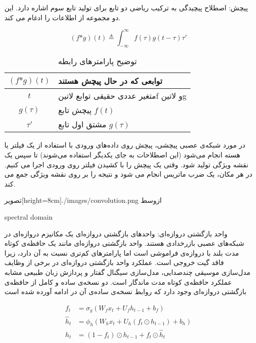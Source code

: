 
پیچش: اصطلاح پیچیدگی به ترکیب ریاضی دو تابع برای تولید تابع سوم اشاره دارد. این دو مجموعه از اطلاعات را ادغام می کند.


\begin{equation}
  \label{eq:base}
(f \text{*} g)(t) \triangleq \int_{-\infty}^\infty f(\tau)g(t - \tau)\tau'
\end{equation}


\begin{table}[h]
  \centering
  \caption{توضیح پارامترهای رابطه }
  \begin{tabular}{|c|p{}|}
    \hline
    $(f \text{*} g)(t)$ & توابعی که در حال پیچش هستند \\
    \hline
    $t$ & متغیر عددی حقیقی توابع  لاتین{f}  و  لاتین{g} \\
    \hline
    $g(\tau)$ & پیچش تابع $f(t)$ \\
    \hline
    $\tau'$ & مشتق اول تابع $g(\tau)$ \\
    \hline
  \end{tabular}
  \label{tbl:distance}
\end{table}


در مورد شبکه‌ی عصبی پیچشی، پیچش روی داده‌های ورودی با استفاده از یک فیلتر یا هسته انجام می‌شود (این اصطلاحات به جای یکدیگر استفاده می‌شوند) تا سپس یک نقشه ویژگی تولید شود. وقتی یک پیچش را با کشیدن فیلتر روی ورودی اجرا می کنیم. در هر مکان، یک ضرب ماتریس انجام می شود و نتیجه را بر روی نقشه ویژگی جمع می کند.

  ‌تصویر[height=8cm]{./images/convolution.png}
  ‌ازوسط

spectral domain


واحد بازگشتی دروازه‌ای: واحدهای بازگشتی دروازه‌ای یک مکانیزم دروازه‌ای در شبکه‌های عصبی بازرخدادی هستند. واحد بازگشتی دروازه‌ای مانند یک حافظه‌ی کوتاه مدت بلند با دروازه‌ی فراموشی است اما پارامترهای کم‌تری نسبت به  آن دارد، زیرا فاقد گیت خروجی است. عملکرد واحد بازگشتی دروازه‌ای در برخی از وظایف مدل‌سازی موسیقی چندصدایی، مدل‌سازی سیگنال گفتار و پردازش زبان طبیعی مشابه عملکرد حافظه‌ی کوتاه مدت ماندگار است. دو نسخه‌ی ساده و کامل از حافظه‌ی بازگشتی دروازه‌ای وجود دارد که روابط نسخه‌ی ساده‌ی آن در ادامه آورده شده است



\begin{equation}
  \label{eq:base}


{\displaystyle {\begin{aligned}f_{t}&=\sigma _{g}(W_{f}x_{t}+U_{f}h_{t-1}+b_{f})\\{\hat {h}}_{t}&=\phi _{h}(W_{h}x_{t}+U_{h}(f_{t}\odot h_{t-1})+b_{h})\\h_{t}&=(1-f_{t})\odot h_{t-1}+f_{t}\odot {\hat {h}}_{t}\end{aligned}}}



\end{equation}


